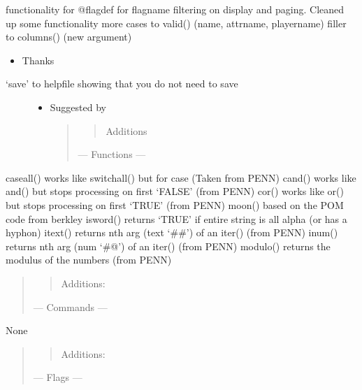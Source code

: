\documentclass[letterpaper,10pt,english]{sphinxmanual}
\begin{document}
\sphinxAtStartPar
functionality for @flagdef for flagname filtering on display and paging.
Cleaned up some functionality
more cases to valid() (name, attrname, playername)
filler to columns() (new argument)
\begin{itemize}
\item {} 
\sphinxAtStartPar
Thanks 

\end{itemize}
\begin{description}
\item[{‘save’ to helpfile showing that you do not need to save}] \leavevmode\begin{itemize}
\item {} 
\sphinxAtStartPar
Suggested by 
\begin{quote}
\begin{quote}

\sphinxAtStartPar
Additions
\end{quote}

\sphinxAtStartPar
— Functions —
\end{quote}

\end{itemize}

\end{description}

\sphinxAtStartPar
caseall() \sphinxhyphen{} works like switchall() but for case (Taken from PENN)
cand() \sphinxhyphen{} works like and() but stops processing on first ‘FALSE’ (from PENN)
cor() \sphinxhyphen{} works like or() but stops processing on first ‘TRUE’ (from PENN)
moon() \sphinxhyphen{} based on the POM code from berkley
isword() \sphinxhyphen{} returns ‘TRUE’ if entire string is all alpha (or has a hyphon)
itext() \sphinxhyphen{} returns nth arg (text ‘\#\#’) of an iter() (from PENN)
inum() \sphinxhyphen{} returns nth arg (num ‘\#@’) of an iter() (from PENN)
modulo() \sphinxhyphen{} returns the modulus of the numbers (from PENN)
\begin{quote}
\begin{quote}

\sphinxAtStartPar
Additions:
\end{quote}

\sphinxAtStartPar
— Commands —
\end{quote}

\sphinxAtStartPar
None
\begin{quote}
\begin{quote}

\sphinxAtStartPar
Additions:
\end{quote}

\sphinxAtStartPar
— Flags —
\end{quote}
\end{document}
